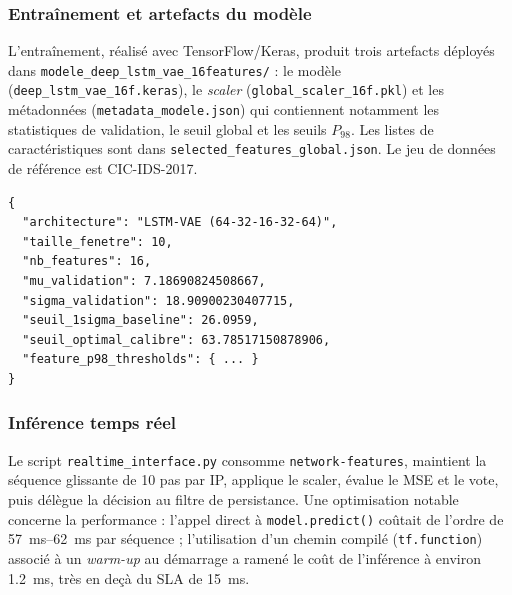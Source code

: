 \subsubsection{Entraînement et artefacts du modèle}

L'entraînement, réalisé avec TensorFlow/Keras, produit trois artefacts déployés dans \texttt{modele\_deep\_lstm\_vae\_16features/} : le modèle (\texttt{deep\_lstm\_vae\_16f.keras}), le \emph{scaler} (\texttt{global\_scaler\_16f.pkl}) et les métadonnées (\texttt{metadata\_modele.json}) qui contiennent notamment les statistiques de validation, le seuil global et les seuils $P_{98}$. Les listes de caractéristiques sont dans \texttt{selected\_features\_global.json}. Le jeu de données de référence est CIC-IDS-2017.


\begin{lstlisting}[style=ngidps, caption={Extrait de \texttt{metadata\_modele.json}}, label={lst:metadata}]
{
  "architecture": "LSTM-VAE (64-32-16-32-64)",
  "taille_fenetre": 10,
  "nb_features": 16,
  "mu_validation": 7.18690824508667,
  "sigma_validation": 18.90900230407715,
  "seuil_1sigma_baseline": 26.0959,
  "seuil_optimal_calibre": 63.78517150878906,
  "feature_p98_thresholds": { ... }
}
\end{lstlisting}

\subsubsection{Inférence temps réel}

Le script \texttt{realtime\_interface.py} consomme \texttt{network-features}, maintient la séquence glissante de 10 pas par IP, applique le scaler, évalue le MSE et le vote, puis délègue la décision au filtre de persistance. Une optimisation notable concerne la performance : l'appel direct à \texttt{model.predict()} coûtait de l'ordre de \SIrange{57}{62}{\milli\second} par séquence ; l'utilisation d'un chemin compilé (\texttt{tf.function}) associé à un \emph{warm-up} au démarrage a ramené le coût de l'inférence à environ \SI{1.2}{\milli\second}, très en deçà du SLA de \SI{15}{\milli\second}.

